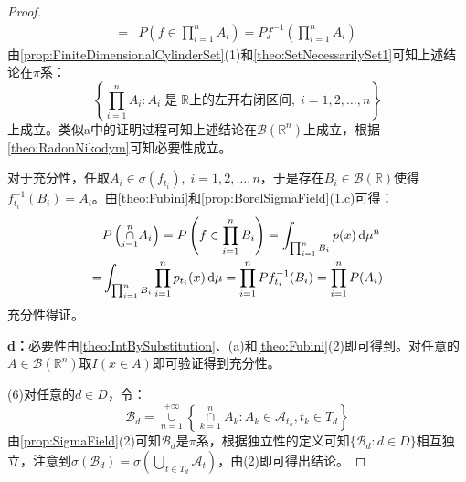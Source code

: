 \begin{proof}
\begin{align*}
		=&P\left(f\in\prod_{i=1}^{n}A_i\right)=Pf^{-1}\left(\prod_{i=1}^{n}A_i\right)
	\end{align*}
	由\cref{prop:FiniteDimensionalCylinderSet}(1)和\cref{theo:SetNecessarilySet1}可知上述结论在$\pi$系：
	\begin{equation*}
		\left\{\prod_{i=1}^{n}A_i:A_i\;\text{是}\;\mathbb{R}\text{上的左开右闭区间},\;i=1,2,\dots,n\right\}
	\end{equation*}
	上成立。类似a中的证明过程可知上述结论在$\mathcal{B}(\mathbb{R}^{n})$上成立，根据\cref{theo:RadonNikodym}可知必要性成立。\par
	对于充分性，任取$A_i\in\sigma(f_{t_i}),\;i=1,2,\dots,n$，于是存在$B_i\in\mathcal{B}(\mathbb{R})$使得$f_{t_i}^{-1}(B_i)=A_i$。由\cref{theo:Fubini}和\cref{prop:BorelSigmaField}(1.c)可得：
	\begin{align*}
		&P\left(\underset{i=1}{\overset{n}{\cap}}A_i\right)=P\left(f\in\prod_{i=1}^nB_i\right)=\int_{\prod_{i=1}^nB_i}p(x)\mathop{}\!\mathrm{d}\mu^n \\
		=&\int_{\prod_{i=1}^nB_i}\prod_{i=1}^{n}p_{t_i}(x)\mathop{}\!\mathrm{d}\mu=\prod_{i=1}^{n}Pf_{t_i}^{-1}(B_i)=\prod_{i=1}^{n}P(A_i)
	\end{align*}
	充分性得证。\par
	\textbf{d：}必要性由\cref{theo:IntBySubstitution}、(a)和\cref{theo:Fubini}(2)即可得到。对任意的$A\in\mathcal{B}(\mathbb{R}^{n})$取$I(x\in A)$即可验证得到充分性。\par
	(6)对任意的$d\in D$，令：
	\begin{equation*}
		\mathscr{B}_d=\underset{n=1}{\overset{+\infty}{\cup}}\left\{\underset{k=1}{\overset{n}{\cap}}A_k:A_k\in\mathscr{A}_{t_k},t_k\in T_d\right\}
	\end{equation*}
	由\cref{prop:SigmaField}(2)可知$\mathscr{B}_d$是$\pi$系，根据独立性的定义可知$\{\mathscr{B}_d:d\in D\}$相互独立，注意到$\sigma(\mathscr{B}_d)=\sigma\left(\underset{t\in T_d}{\overset{}{\bigcup}}\mathscr{A}_t\right)$，由(2)即可得出结论。
\end{proof}
